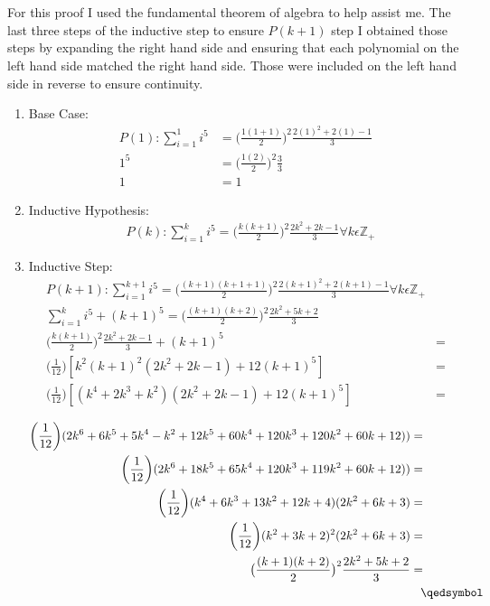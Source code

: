\documentclass[12pt]{article}
\begin{document}
\\\\For this proof I used the fundamental theorem of algebra to help assist me. The last three steps of the inductive step to ensure \begin{math}P(k+1)\end{math} step I obtained those steps by expanding the right hand side and ensuring that each polynomial on the left hand side matched the right hand side. Those were included on the left hand side in reverse to ensure continuity.\\
\begin{enumerate}

\item Base Case:\\
\begin{align*}
P(1):\sum\limits_{i = 1}^{1} i^5 &= \big(\frac{1(1 + 1)}{2}\big)^2\frac{2(1)^2+2(1)-1}{3}\\
1^5 &= \big(\frac{1(2)}{2}\big)^2\frac{3}{3}\\
1 &= 1
\end{align*}

\item Inductive Hypothesis:
\begin{align*}
&P(k):\sum\limits_{i = 1}^{k} i^5 = \big(\frac{k(k + 1)}{2}\big)^2\frac{2k^2+2k-1}{3} \forall k \epsilon \mathbb{Z}_+
\end{align*}
\item Inductive Step:
\begin{align*}
P(k+1):\sum\limits_{i = 1}^{k+1} i^5 = \big(\frac{(k+1)(k + 1 + 1)}{2}\big)^2\frac{2(k+1)^2+2(k+1)-1}{3} \forall k \epsilon \mathbb{Z}_+ \\
\sum\limits_{i = 1}^{k} i^5 + (k + 1)^5 = \big(\frac{(k+1)(k + 2)}{2}\big)^2\frac{2k^2+5k+2}{3} \\
\bigg(\frac{k(k + 1)}{2}\bigg)^2\frac{2k^2+2k-1}{3} + (k + 1)^5 &=\\
\bigg(\frac{1}{12}\bigg)[k^2(k+1)^2(2k^2+2k-1)+12(k+1)^5]&= \\
\bigg(\frac{1}{12}\bigg)[(k^4+2k^3+k^2)(2k^2+2k-1)+12(k+1)^5]&=\\
\end{align*}
\begin{align*}
\bigg(\frac{1}{12}\bigg)(2k^6+6k^5+5k^4-k^2+12k^5+60k^4+120k^3+120k^2+60k+12))&=\\
\bigg(\frac{1}{12}\bigg)(2k^6+18k^5+65k^4+120k^3+119k^2+60k+12))&=\\
\bigg(\frac{1}{12}\bigg)(k^4+6k^3+13k^2+12k+4)(2k^2+6k+3)&=\\
\bigg(\frac{1}{12}\bigg)(k^2+3k+2)^2(2k^2+6k+3)&=\\
\big(\frac{(k+1)(k + 2)}{2}\big)^2\frac{2k^2+5k+2}{3}&=\\
&\hspace{0.3cm}\qedsymbol
\end{align*}
\end{enumerate}
\end{document}
